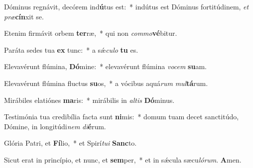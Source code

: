 \item Dóminus regnávit, decórem ind\textbf{ú}tus est:~* indútus est Dóminus fortitúdinem, \textit{et} \textit{præ}\textbf{cín}xit se.

\item Etenim firmávit orbem \textbf{ter}ræ,~* qui non \textit{commo}\textbf{vé}bitur.

\item Paráta sedes tua \textbf{ex} tunc:~* a sǽ\textit{culo} \textbf{tu} es.

\item Elevavérunt flúmina, \textbf{Dó}mine:~* elevavérunt flúmina \textit{vocem} \textbf{su}am.

\item Elevavérunt flúmina fluctus \textbf{su}os,~* a vócibus aquá\textit{rum} \textit{mul}\textbf{tá}rum.

\item Mirábiles elatiónes \textbf{ma}ris:~* mirábilis in \textit{altis} \textbf{Dó}minus.

\item Testimónia tua credibília facta sunt \textbf{ni}mis:~* domum tuam decet sanctitúdo, Dómine, in longitúdi\textit{nem} \textit{di}\textbf{é}rum.

\item Glória Patri, et \textbf{Fí}lio,~* et Spirí\textit{tui} \textbf{Sanc}to.

\item Sicut erat in princípio, et nunc, et \textbf{sem}per,~* et in sǽcula sæcu\textit{lórum}. \textbf{A}men.